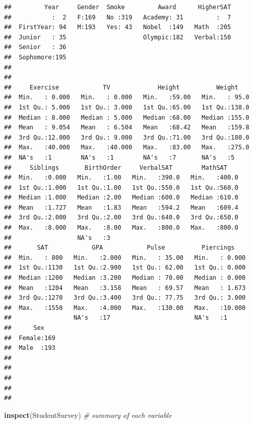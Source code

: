 \documentclass[]{book}
\newenvironment{Shaded}{\begin{snugshade}}{\end{snugshade}}
\newcommand{\CommentTok}[1]{\textcolor[rgb]{0.56,0.35,0.01}{\textit{#1}}}
\newcommand{\KeywordTok}[1]{\textcolor[rgb]{0.13,0.29,0.53}{\textbf{#1}}}
\newcommand{\NormalTok}[1]{#1}
\begin{document}
\begin{verbatim}
##         Year     Gender  Smoke         Award      HigherSAT  
##           :  2   F:169   No :319   Academy: 31         :  7  
##  FirstYear: 94   M:193   Yes: 43   Nobel  :149   Math  :205  
##  Junior   : 35                     Olympic:182   Verbal:150  
##  Senior   : 36                                               
##  Sophomore:195                                               
##                                                              
##                                                              
##     Exercise            TV             Height          Weight     
##  Min.   : 0.000   Min.   : 0.000   Min.   :59.00   Min.   : 95.0  
##  1st Qu.: 5.000   1st Qu.: 3.000   1st Qu.:65.00   1st Qu.:138.0  
##  Median : 8.000   Median : 5.000   Median :68.00   Median :155.0  
##  Mean   : 9.054   Mean   : 6.504   Mean   :68.42   Mean   :159.8  
##  3rd Qu.:12.000   3rd Qu.: 9.000   3rd Qu.:71.00   3rd Qu.:180.0  
##  Max.   :40.000   Max.   :40.000   Max.   :83.00   Max.   :275.0  
##  NA's   :1        NA's   :1        NA's   :7       NA's   :5      
##     Siblings       BirthOrder     VerbalSAT        MathSAT     
##  Min.   :0.000   Min.   :1.00   Min.   :390.0   Min.   :400.0  
##  1st Qu.:1.000   1st Qu.:1.00   1st Qu.:550.0   1st Qu.:560.0  
##  Median :1.000   Median :2.00   Median :600.0   Median :610.0  
##  Mean   :1.727   Mean   :1.83   Mean   :594.2   Mean   :609.4  
##  3rd Qu.:2.000   3rd Qu.:2.00   3rd Qu.:640.0   3rd Qu.:650.0  
##  Max.   :8.000   Max.   :8.00   Max.   :800.0   Max.   :800.0  
##                  NA's   :3                                     
##       SAT            GPA            Pulse          Piercings     
##  Min.   : 800   Min.   :2.000   Min.   : 35.00   Min.   : 0.000  
##  1st Qu.:1130   1st Qu.:2.900   1st Qu.: 62.00   1st Qu.: 0.000  
##  Median :1200   Median :3.200   Median : 70.00   Median : 0.000  
##  Mean   :1204   Mean   :3.158   Mean   : 69.57   Mean   : 1.673  
##  3rd Qu.:1270   3rd Qu.:3.400   3rd Qu.: 77.75   3rd Qu.: 3.000  
##  Max.   :1550   Max.   :4.000   Max.   :130.00   Max.   :10.000  
##                 NA's   :17                       NA's   :1       
##      Sex     
##  Female:169  
##  Male  :193  
##              
##              
##              
##              
## 
\end{verbatim}

\begin{Shaded}
\begin{Highlighting}[]
\KeywordTok{inspect}\NormalTok{(StudentSurvey) }\CommentTok{# summary of each variable}
\end{Highlighting}
\end{Shaded}
\end{document}
